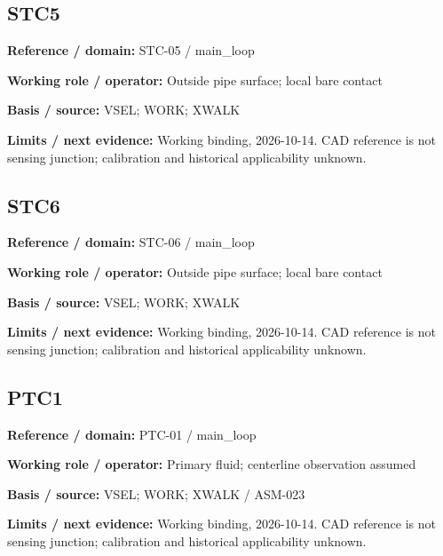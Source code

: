 \documentclass[11pt]{article}
\begin{document}
\par\noindent\begin{minipage}{\textwidth}\small\setlength{\parskip}{2pt}
\subsection*{STC5}
\textbf{Reference / domain:} STC-05 / main\_\allowbreak{}loop\par
\textbf{Working role / operator:} Outside pipe surface; local bare contact\par
\textbf{Basis / source:} VSEL; WORK; XWALK\par
\textbf{Limits / next evidence:} Working binding, 2026-10-14. CAD reference is not sensing junction; calibration and historical applicability unknown.\par
\end{minipage}\par\vspace{5pt}
\par\noindent\begin{minipage}{\textwidth}\small\setlength{\parskip}{2pt}
\subsection*{STC6}
\textbf{Reference / domain:} STC-06 / main\_\allowbreak{}loop\par
\textbf{Working role / operator:} Outside pipe surface; local bare contact\par
\textbf{Basis / source:} VSEL; WORK; XWALK\par
\textbf{Limits / next evidence:} Working binding, 2026-10-14. CAD reference is not sensing junction; calibration and historical applicability unknown.\par
\end{minipage}\par\vspace{5pt}
\par\noindent\begin{minipage}{\textwidth}\small\setlength{\parskip}{2pt}
\subsection*{PTC1}
\textbf{Reference / domain:} PTC-01 / main\_\allowbreak{}loop\par
\textbf{Working role / operator:} Primary fluid; centerline observation assumed\par
\textbf{Basis / source:} VSEL; WORK; XWALK / ASM-023\par
\textbf{Limits / next evidence:} Working binding, 2026-10-14. CAD reference is not sensing junction; calibration and historical applicability unknown.\par
\end{minipage}\par\vspace{5pt}
\end{document}
